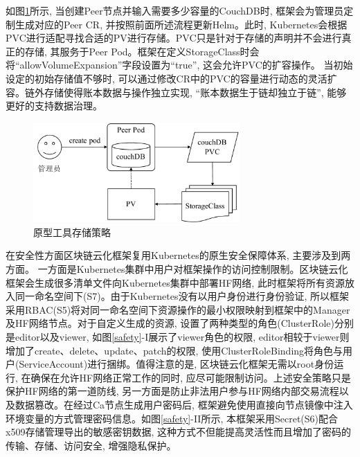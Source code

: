 如图\ref{pvc_sc}所示, 当创建Peer节点并输入需要多少容量的CouchDB时, 框架会为管理员定制生成对应的Peer CR, 并按照前面所述流程更新Helm。此时, Kubernetes会根据PVC进行适配寻找合适的PV进行存储。PVC只是针对于存储的声明并不会进行真正的存储, 其服务于Peer Pod。框架在定义StorageClass时会将“allowVolumeExpansion”字段设置为“true”, 这会允许PVC的扩容操作。 当初始设定的初始存储值不够时, 可以通过修改CR中的PVC的容量进行动态的灵活扩容。链外存储使得账本数据与操作独立实现, “账本数据生于链却独立于链”, 能够更好的支持数据治理。

\begin{figure}[h] %
    \centering %
    \includegraphics[width=0.7\textwidth]{FIGs/chapter4/pvc_sc.pdf} %
    \caption{原型工具存储策略} %
    \label{pvc_sc} %
\end{figure}%

在安全性方面区块链云化框架复用Kubernetes的原生安全保障体系, 主要涉及到两方面。 一方面是Kubernetes集群中用户对框架操作的访问控制限制。区块链云化框架会生成很多清单文件向Kubernetes集群中部署HF网络, 此时框架将所有资源放入同一命名空间下(S7)。由于Kubernetes没有以用户身份进行身份验证, 所以框架采用RBAC(S5)将对同一命名空间下资源操作的最小权限映射到框架中的Manager及HF网络节点。对于自定义生成的资源, 设置了两种类型的角色(ClusterRole)分别是editor以及viewer, 如图\ref{safety}-I展示了viewer角色的权限, editor相较于viewer则增加了create、delete、update、patch的权限, 使用ClusterRoleBinding将角色与用户(ServiceAccount)进行捆绑。值得注意的是, 区块链云化框架无需以root身份运行, 在确保在允许HF网络正常工作的同时, 应尽可能限制访问。上述安全策略只是保护HF网络的第一道防线, 另一方面是防止非法用户参与HF网络内部交易流程以及数据篡改。在经过Ca节点生成用户密码后, 框架避免使用直接向节点镜像中注入环境变量的方式管理密码信息。如图\ref{safety}-II所示, 本框架采用Secret(S6)配合x509\cite{8249485}存储管理导出的敏感密钥数据, 这种方式不但能提高灵活性而且增加了密码的传输、存储、访问安全, 增强隐私保护。

